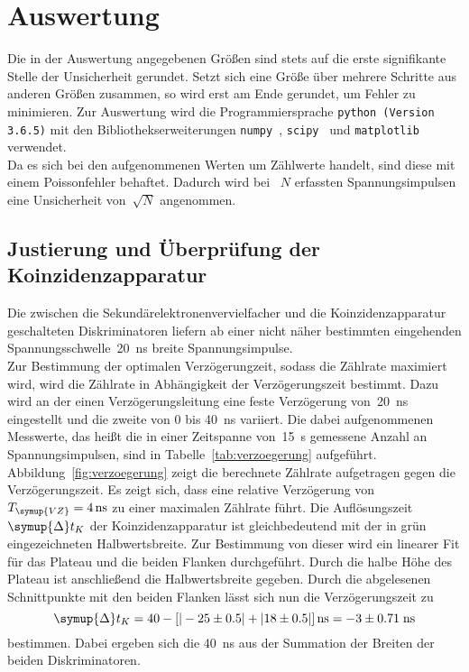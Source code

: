 \section{Auswertung}
\label{sec:auswertung}
Die in der Auswertung angegebenen Größen sind stets auf die erste signifikante
Stelle der Unsicherheit gerundet. Setzt sich eine Größe über mehrere Schritte aus
anderen Größen zusammen, so wird erst am Ende gerundet, um Fehler zu minimieren.
Zur Auswertung wird die Programmiersprache \texttt{python (Version 3.6.5)} mit
den Bibliothekserweiterungen \texttt{numpy}~\cite{numpy},
\texttt{scipy}~\cite{scipy} und \texttt{matplotlib}~\cite{matplotlib} verwendet.\\
\newline
Da es sich bei den aufgenommenen Werten um Zählwerte handelt, sind diese mit einem
Poissonfehler behaftet. Dadurch wird bei ~$N$ erfassten Spannungsimpulsen eine Unsicherheit
von~$\sqrt{N}$ angenommen.

\subsection{Justierung und Überprüfung der Koinzidenzapparatur}
Die zwischen die Sekundärelektronenvervielfacher und die Koinzidenzapparatur
geschalteten Diskriminatoren liefern ab einer nicht näher bestimmten eingehenden
Spannungsschwelle~\SI{20}{\nano\second} breite Spannungsimpulse.\\
\newline
Zur Bestimmung der optimalen Verzögerungzeit, sodass die Zählrate maximiert wird,
wird die Zählrate in Abhängigkeit der Verzögerungszeit bestimmt. Dazu wird an der
einen Verzögerungsleitung eine feste Verzögerung von~\SI{20}{\nano\second} eingestellt
und die zweite von $0$ bis \SI{40}{\nano\second} variiert.
Die dabei aufgenommenen Messwerte, das heißt die in einer Zeitspanne von~\SI{15}{\second}
gemessene Anzahl an Spannungsimpulsen, sind in Tabelle~\ref{tab:verzoegerung} aufgeführt.
Abbildung~\ref{fig:verzoegerung} zeigt die berechnete Zählrate aufgetragen gegen
die Verzögerungszeit. Es zeigt sich, dass eine relative Verzögerung
von~$T_{\symup{VZ}}=\SI{4}{\nano\second}$ zu einer maximalen Zählrate führt.
Die Auflösungszeit~$\symup{\Delta}t_K$ der Koinzidenzapparatur ist gleichbedeutend
mit der in grün eingezeichneten Halbwertsbreite. Zur Bestimmung von dieser wird
ein linearer Fit für das Plateau und die beiden Flanken durchgeführt. Durch die halbe
Höhe des Plateau ist anschließend die Halbwertsbreite gegeben. Durch die abgelesenen Schnittpunkte
mit den beiden Flanken lässt sich nun die Verzögerungszeit zu
\begin{equation}
  \symup{\Delta}t_K = 40 - \left[ |-25 \pm 0.5| + |18 \pm 0.5| \right] \si{\nano\second} = -3 \pm 0.71\; \si{\nano\second}
\end{equation}
bestimmen. Dabei ergeben sich die \SI{40}{\nano\second} aus der Summation der Breiten der beiden Diskriminatoren.

